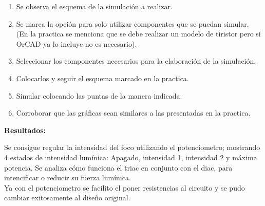 \documentclass[letterpaper]{article}
\begin{document}
\begin{large}
        \begin{enumerate}
            \item Se observa el esquema de la simulación a realizar.
            \item Se marca la opción para solo utilizar componentes que se puedan simular.\\
                  (En la practica se menciona que se debe realizar un modelo de tiristor pero si OrCAD ya lo incluye no es necesario).
            \item Seleccionar los componentes necesarios para la elaboración de la simulación.
            \item Colocarlos y seguir el esquema marcado en la practica.
            \item Simular colocando las puntas de la manera indicada.
            \item Corroborar que las gráficas sean similares a las presentadas en la practica.
        \end{enumerate}
    \end{large}
\begin{LARGE}
\textbf{Resultados:}\\
\end{LARGE}
\begin{large}
    Se consigue regular la intensidad del foco utilizando el potenciometro; mostrando 4 estados de intensidad lumínica: Apagado, intensidad 1, intensidad 2 y máxima potencia. Se analiza cómo funciona el triac en conjunto con el diac, para intencificar o reducir su fuerza lumínica.\\
    Ya con el potenciometro se facilito el poner resistencias al circuito y se pudo cambiar exitosamente al diseño original.\\
\end{large}




   
    
\end{document}
